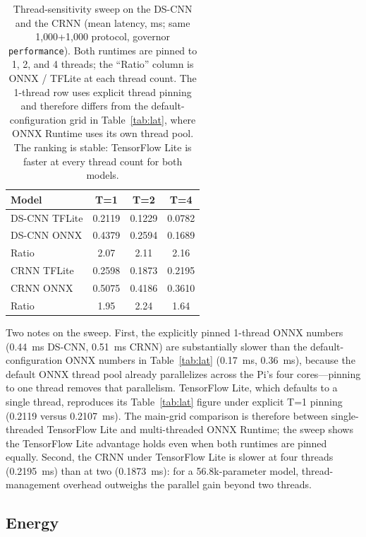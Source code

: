 \documentclass[conference,a4paper]{IEEEtran}
\begin{document}
\begin{table}[t]
\caption{Thread-sensitivity sweep on the DS-CNN and the CRNN (mean latency, ms; same 1{,}000+1{,}000 protocol, governor \texttt{performance}). Both runtimes are pinned to 1, 2, and 4 threads; the ``Ratio'' column is ONNX / TFLite at each thread count. The 1-thread row uses explicit thread pinning and therefore differs from the default-configuration grid in Table~\ref{tab:lat}, where ONNX Runtime uses its own thread pool. The ranking is stable: TensorFlow Lite is faster at every thread count for both models.}
\label{tab:threads}
\centering
{\footnotesize
\setlength{\tabcolsep}{4pt}
\begin{tabular}{lccc}
\toprule
Model & T=1 & T=2 & T=4 \\
\midrule
DS-CNN TFLite & 0.2119 & 0.1229 & 0.0782 \\
DS-CNN ONNX & 0.4379 & 0.2594 & 0.1689 \\
Ratio & 2.07 & 2.11 & 2.16 \\
\midrule
CRNN TFLite & 0.2598 & 0.1873 & 0.2195 \\
CRNN ONNX & 0.5075 & 0.4186 & 0.3610 \\
Ratio & 1.95 & 2.24 & 1.64 \\
\bottomrule
\end{tabular}
}
\end{table}

Two notes on the sweep. First, the explicitly pinned 1-thread ONNX numbers (0.44~ms DS-CNN, 0.51~ms CRNN) are substantially slower than the default-configuration ONNX numbers in Table~\ref{tab:lat} (0.17~ms, 0.36~ms), because the default ONNX thread pool already parallelizes across the Pi's four cores---pinning to one thread removes that parallelism. TensorFlow Lite, which defaults to a single thread, reproduces its Table~\ref{tab:lat} figure under explicit T=1 pinning (0.2119 versus 0.2107~ms). The main-grid comparison is therefore between single-threaded TensorFlow Lite and multi-threaded ONNX Runtime; the sweep shows the TensorFlow Lite advantage holds even when both runtimes are pinned equally. Second, the CRNN under TensorFlow Lite is slower at four threads (0.2195~ms) than at two (0.1873~ms): for a 56.8k-parameter model, thread-management overhead outweighs the parallel gain beyond two threads.



\subsection{Energy}
\label{sec:energy}
\end{document}
